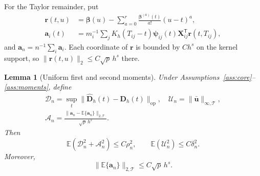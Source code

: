 \documentclass[10pt]{book}
\newtheorem{lemma}{Lemma}
\newcommand{\ba}{{\mathbf a}}
\newcommand{\br}{{\mathbf r}}
\newcommand{\bu}{{\mathbf u}}
\newcommand{\bD}{{\mathbf D}}
\newcommand{\bX}{{\mathbf X}}
\newcommand{\bbeta}  {\boldsymbol{\beta}}
\newcommand{\bpsi} {\boldsymbol{{\mathbf \psi}}}
\newcommand{\expect}{\mathbb{E}}
\newcommand{\trans}{{\scriptscriptstyle\mathsf{T}}}
\numberwithin{equation}{section}
\begin{document}
For the Taylor remainder, put
\[
\begin{aligned}
\br(t,u)&=\bbeta(u)-\sum_{a=0}^r
\frac{\bbeta^{(a)}(t)}{a!}(u-t)^a,
\\
\ba_i(t)&=m_i^{-1}\sum_jK_h(T_{ij}-t)
\bpsi_{ij}(t)\bX_{ij}^\trans\br(t,T_{ij}),
\end{aligned}
\]
and $\ba_n=n^{-1}\sum_i\ba_i$. Each coordinate of $\br$ is bounded
by $Ch^s$ on the kernel support, so
$\|\br(t,u)\|_2\le C\sqrt p\,h^s$ there.

\begin{lemma}[Uniform first and second moments]
\label{lem:hd-concentration}
Under Assumptions~\ref{ass:core}--\ref{ass:moments}, define
\[
\begin{gathered}
\mathcal D_n=\sup_t\|\widehat{\bD}_h(t)-\bD_h(t)\|_{\mathrm{op}},\quad
\mathcal U_n=\|\bar\bu\|_{\infty,\mathcal T},\\
\mathcal A_n=\frac{\|\ba_n-\expect\{\ba_n\}\|_{2,\mathcal T}}
{\sqrt p\,h^s}.
\end{gathered}
\]
Then
\[
\expect(\mathcal D_n^2+\mathcal A_n^2)\le C\rho_n^2,
\qquad \expect(\mathcal U_n^2)\le C\delta_n^2.
\]
Moreover,
\[
\|\expect\{\ba_n\}\|_{2,\mathcal T}\le C\sqrt p\,h^s.
\]
\end{lemma}
\end{document}
